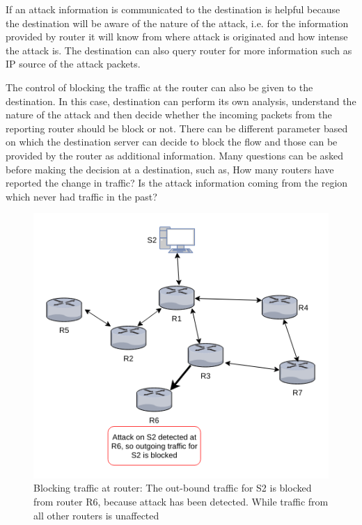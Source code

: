 \documentclass[12pt,oneside,a4paper]{article}
\begin{document}
If an attack information is communicated to the destination is helpful because the destination will be aware of the nature of the attack, i.e. for the information provided by router it will know from where attack is originated and how intense the attack is. The destination can also query router for more information such as IP source of the attack packets.

The control of blocking the traffic at the router can also be given to the destination. In this case, destination can perform its own analysis, understand the nature of the attack and then decide whether the incoming packets from the reporting router should be block or not. There can be different parameter based on which the destination server can decide to block the flow and those can be provided by the router as additional information. Many questions can be asked before making the decision at a destination, such as, How many routers have reported the change in traffic? Is the attack information coming from the region which never had traffic in the past?

\begin{figure}[H]
\centering
\includegraphics[scale=0.60]{mitigation_path.png}
\caption{Blocking traffic at router: The out-bound traffic for S2 is blocked from router R6,
because attack has been detected. While traffic from all other routers is unaffected} \label{fig:mitigation_path}
\end{figure}
\end{document}
